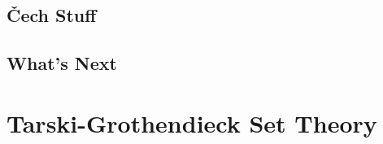 \documentclass[a4paper,11pt,psamsfonts,reqno]{amsbook}
\newcounter{prpcounter}
\theoremstyle{proposition}
\theoremstyle{proof}
\begin{document}
\section{\v{C}ech Stuff}
\label{sec:check}



\section{What's Next}
\label{sec:whatsnext}




\newpage



\nocite{c55c71e8}
\nocite{e837ef86}
\nocite{dc6f686f}
\nocite{1ba1603e}
\nocite{52fbba46}
\nocite{8b5861fc}
\nocite{wiki-nlab0000}
\nocite{wiki-pedia0en}






\appendix
\chapter{Tarski-Grothendieck Set Theory}
\label{chap:tg}

\end{document}
